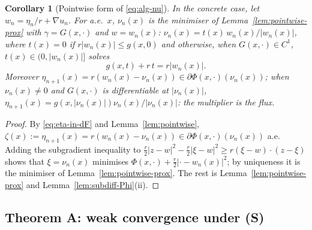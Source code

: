 \documentclass[11pt]{amsart}
\newtheorem{corollary}[theorem]{Corollary}
\theoremstyle{definition}
\theoremstyle{remark}
\numberwithin{equation}{section}
\newcommand{\abs}[1]{\lvert #1\rvert}
\begin{document}
\begin{corollary}[Pointwise form of \eqref{eq:alg-nu}]\label{cor:pointwise-nu}
In the concrete case, let $w_n=\eta_n/r+\nabla u_n$. For a.e.\ $x$, $\nu_n(x)$ is the minimiser of Lemma~\ref{lem:pointwise-prox} with $\gamma=G(x,\cdot)$ and $w=w_n(x)$: $\nu_n(x)=t(x)\,w_n(x)/\abs{w_n(x)}$, where $t(x)=0$ if $r\abs{w_n(x)}\le g(x,0)$ and otherwise, when $G(x,\cdot)\in C^1$, $t(x)\in(0,\abs{w_n(x)}]$ solves
\begin{equation}\label{eq:scalar}
g(x,t)+r\,t=r\abs{w_n(x)} .
\end{equation}
Moreover $\eta_{n+1}(x)=r(w_n(x)-\nu_n(x))\in\partial\Phi(x,\cdot)(\nu_n(x))$; when $\nu_n(x)\ne0$ and $G(x,\cdot)$ is differentiable at $\abs{\nu_n(x)}$, $\eta_{n+1}(x)=g(x,\abs{\nu_n(x)})\nu_n(x)/\abs{\nu_n(x)}$: the multiplier is the flux.
\end{corollary}
\begin{proof}
By \eqref{eq:eta-in-dF} and Lemma~\ref{lem:pointwise}, $\zeta(x):=\eta_{n+1}(x)=r(w_n(x)-\nu_n(x))\in\partial\Phi(x,\cdot)(\nu_n(x))$ a.e. Adding the subgradient inequality to $\frac r2\abs{z-w}^2-\frac r2\abs{\xi-w}^2\ge r(\xi-w)\cdot(z-\xi)$ shows that $\xi=\nu_n(x)$ minimises $\Phi(x,\cdot)+\frac r2\abs{\cdot-w_n(x)}^2$; by uniqueness it is the minimiser of Lemma~\ref{lem:pointwise-prox}. The rest is Lemma~\ref{lem:pointwise-prox} and Lemma~\ref{lem:subdiff-Phi}(ii).
\end{proof}

\subsection{Theorem A: weak convergence under (S)}\label{ssec:thmA}
\end{document}
